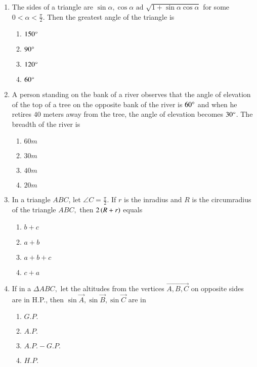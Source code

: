 \documentclass[journal]{IEEEtran}
\theoremstyle{remark}
\begin{document}
\begin{enumerate}[start=3]
\item The sides of a triangle are $\sin\alpha,\cos\alpha \text{ ad } \sqrt{1+\sin\alpha\cos\alpha}$ for some $0<\alpha<\frac{\pi}{2}.$ Then the greatest angle of the triangle is \hfill{}
\begin{multicols}{4}
\begin{enumerate}
        \item $150\degree$                    
        \item $90\degree$ 
        \item $120\degree$
        \item $60\degree$
\end{enumerate}
\end{multicols} 

\item A person standing on the bank of a river observes that the angle of elevation of the top of a tree on the opposite bank of the river is $60\degree$ and when he retires $40$ meters away from the tree, the angle of elevation becomes $30\degree$. The breadth of the river is 

\hfill{}
\begin{multicols}{4}
\begin{enumerate}
        \item $60m$                    
        \item $30m$ 
        \item $40m$ 
        \item $20m$
\end{enumerate}
\end{multicols} 

\item In a triangle $ABC$, let $\angle{C}=\frac{\pi}{2}.$ If $r$ is the inradius and $R$ is the circumradius of the triangle $ABC,$ then $2\left(R+r\right)$ equals \hfill{}
\begin{multicols}{4}
\begin{enumerate}
        \item $b+c$                    
        \item $a+b$ 
        \item $a+b+c$ 
        \item $c+a$
\end{enumerate}
\end{multicols} 

\item If in a $\Delta ABC,$ let the altitudes from the vertices $\vec{A,B,C}$ on opposite sides are in H.P., then $\sin \vec{A},\sin \vec{B},\sin \vec{C}$ are in \hfill{}
\begin{multicols}{4}
\begin{enumerate}
        \item $G.P.$                    
        \item $A.P.$ 
        \item $A.P.-G.P.$ 
        \item $H.P.$
\end{enumerate}
\end{multicols} 


\end{enumerate}
\end{document}
